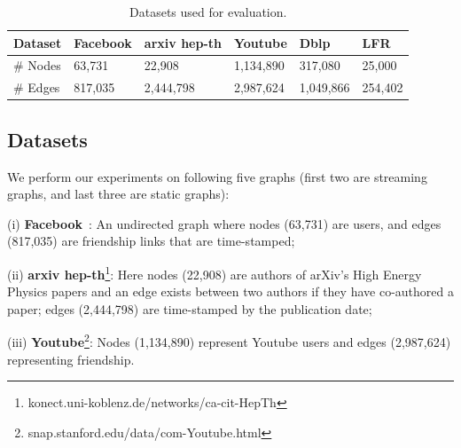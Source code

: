 \begin{table}[]
\centering
\caption{Datasets used for evaluation.}
\label{tab:data}
\begin{tabular}{l l l l l l}
\hline
Dataset  & Facebook & arxiv hep-th & Youtube   & Dblp      & LFR     \\ \hline
\# Nodes & 63,731   & 22,908       & 1,134,890 & 317,080   & 25,000  \\ 
\# Edges & 817,035  & 2,444,798    & 2,987,624 & 1,049,866 & 254,402 \\ \hline
\end{tabular}
\vspace{3mm}
\end{table}



\subsection{Datasets}\label{sec:dataset}

We perform our experiments on following five graphs  (first two are streaming graphs, and last three are static graphs):  

(i) {\bf Facebook}~\cite{d1}: 
An undirected graph where nodes (63,731) are users, and edges (817,035) are friendship links that are time-stamped;  %

(ii) {\bf arxiv hep-th}\footnote{konect.uni-koblenz.de/networks/ca-cit-HepTh}: 
Here nodes (22,908) are authors of arXiv's High Energy Physics papers and an edge exists between two authors if they have co-authored a paper; edges (2,444,798) are time-stamped by the publication date;%
 
 (iii) {\bf Youtube}\footnote{snap.stanford.edu/data/com-Youtube.html}:
Nodes (1,134,890) represent Youtube users and edges (2,987,624) representing friendship.

